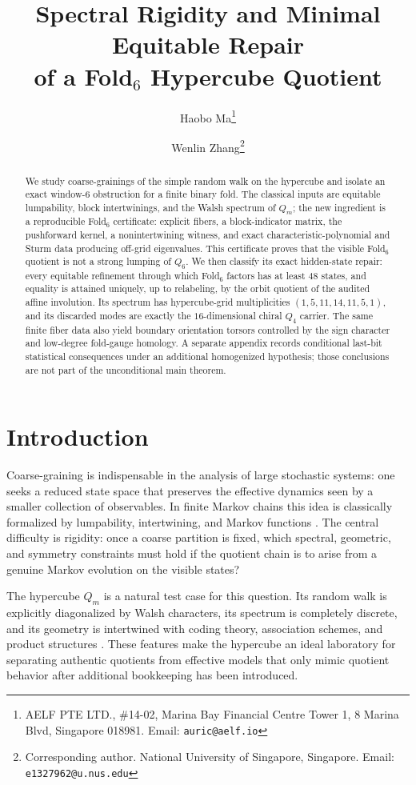 \documentclass[12pt,a4paper]{article}
\title{Spectral Rigidity and Minimal Equitable Repair\\
of a Fold\texorpdfstring{$_6$}{6} Hypercube Quotient}
\author{
  Haobo Ma\thanks{AELF PTE LTD., \#14-02, Marina Bay Financial Centre Tower 1, 8 Marina Blvd, Singapore 018981. Email: \texttt{auric@aelf.io}}
  \and
  Wenlin Zhang\thanks{Corresponding author. National University of Singapore, Singapore. Email: \texttt{e1327962@u.nus.edu}}
}
\date{}
\theoremstyle{plain}
\theoremstyle{definition}
\numberwithin{equation}{section}
\begin{document}
\maketitle

\begin{abstract}
We study coarse-grainings of the simple random walk on the hypercube and isolate an exact window-\(6\) obstruction for a finite binary fold.  The classical inputs are equitable lumpability, block intertwinings, and the Walsh spectrum of \(Q_m\); the new ingredient is a reproducible Fold\(_6\) certificate: explicit fibers, a block-indicator matrix, the pushforward kernel, a nonintertwining witness, and exact characteristic-polynomial and Sturm data producing off-grid eigenvalues.  This certificate proves that the visible Fold\(_6\) quotient is not a strong lumping of \(Q_6\).  We then classify its exact hidden-state repair: every equitable refinement through which Fold\(_6\) factors has at least \(48\) states, and equality is attained uniquely, up to relabeling, by the orbit quotient of the audited affine involution.  Its spectrum has hypercube-grid multiplicities \((1,5,11,14,11,5,1)\), and its discarded modes are exactly the \(16\)-dimensional chiral \(Q_4\) carrier.  The same finite fiber data also yield boundary orientation torsors controlled by the sign character and low-degree fold-gauge homology.  A separate appendix records conditional last-bit statistical consequences under an additional homogenized hypothesis; those conclusions are not part of the unconditional main theorem.
\end{abstract}

\section{Introduction}\label{sec:introduction}
Coarse-graining is indispensable in the analysis of large stochastic systems: one seeks a reduced state space that preserves the effective dynamics seen by a smaller collection of observables. In finite Markov chains this idea is classically formalized by lumpability, intertwining, and Markov functions \cite{burke1958markovian,kemeny1976finite,rogers1981markov,buchholz1994exact,levin2017markov}. The central difficulty is rigidity: once a coarse partition is fixed, which spectral, geometric, and symmetry constraints must hold if the quotient chain is to arise from a genuine Markov evolution on the visible states?

The hypercube \(Q_m\) is a natural test case for this question. Its random walk is explicitly diagonalized by Walsh characters, its spectrum is completely discrete, and its geometry is intertwined with coding theory, association schemes, and product structures \cite{biggs1993algebraic,brouwer1989distance,godsil2001algebraic,macwilliams1977theory,lovasz1996random,diaconis1988group}. These features make the hypercube an ideal laboratory for separating authentic quotients from effective models that only mimic quotient behavior after additional bookkeeping has been introduced.
\end{document}
